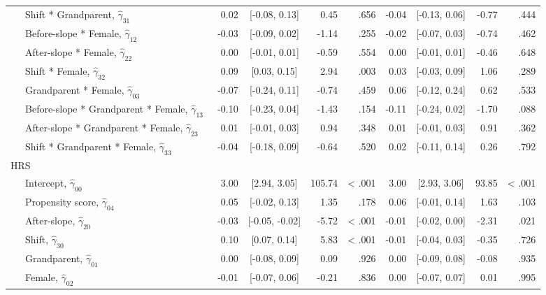 \documentclass[
  english,
  man, noextraspace]{apa7}
\newenvironment{lltable}{\begin{landscape}\begin{center}\begin{ThreePartTable}}{\end{ThreePartTable}\end{center}\end{landscape}}
\begin{document}
\begin{appendix}
\begin{lltable}
{\begin{longtable}{lrcrrrcrr}
\ \ \ Shift * Grandparent, $\hat{\gamma}_{31}$ \textcolor{white}{L} & 0.02 & [-0.08, 0.13] & 0.45 & .656 & -0.04 & [-0.13, 0.06] & -0.77 & .444\\
\ \ \ Before-slope * Female, $\hat{\gamma}_{12}$ & -0.03 & [-0.09, 0.02] & -1.14 & .255 & -0.02 & [-0.07, 0.03] & -0.74 & .462\\
\ \ \ After-slope * Female, $\hat{\gamma}_{22}$ \textcolor{white}{L} & 0.00 & [-0.01, 0.01] & -0.59 & .554 & 0.00 & [-0.01, 0.01] & -0.46 & .648\\
\ \ \ Shift * Female, $\hat{\gamma}_{32}$ \textcolor{white}{L} & 0.09 & [0.03, 0.15] & 2.94 & .003 & 0.03 & [-0.03, 0.09] & 1.06 & .289\\
\ \ \ Grandparent * Female, $\hat{\gamma}_{03}$ \textcolor{white}{L} & -0.07 & [-0.24, 0.11] & -0.74 & .459 & 0.06 & [-0.12, 0.24] & 0.62 & .533\\
\ \ \ Before-slope * Grandparent * Female, $\hat{\gamma}_{13}$ & -0.10 & [-0.23, 0.04] & -1.43 & .154 & -0.11 & [-0.24, 0.02] & -1.70 & .088\\
\ \ \ After-slope * Grandparent * Female, $\hat{\gamma}_{23}$ \textcolor{white}{L} & 0.01 & [-0.01, 0.03] & 0.94 & .348 & 0.01 & [-0.01, 0.03] & 0.91 & .362\\
\ \ \ Shift * Grandparent * Female, $\hat{\gamma}_{33}$ \textcolor{white}{L} & -0.04 & [-0.18, 0.09] & -0.64 & .520 & 0.02 & [-0.11, 0.14] & 0.26 & .792\\
HRS &  &  &  &  &  &  &  & \\
\ \ \ Intercept, $\hat{\gamma}_{00}$ \textcolor{white}{H} & 3.00 & [2.94, 3.05] & 105.74 & < .001 & 3.00 & [2.93, 3.06] & 93.85 & < .001\\
\ \ \ Propensity score, $\hat{\gamma}_{04}$ \textcolor{white}{H} & 0.05 & [-0.02, 0.13] & 1.35 & .178 & 0.06 & [-0.01, 0.14] & 1.63 & .103\\
\ \ \ After-slope, $\hat{\gamma}_{20}$ \textcolor{white}{H} & -0.03 & [-0.05, -0.02] & -5.72 & < .001 & -0.01 & [-0.02, 0.00] & -2.31 & .021\\
\ \ \ Shift, $\hat{\gamma}_{30}$ \textcolor{white}{H} & 0.10 & [0.07, 0.14] & 5.83 & < .001 & -0.01 & [-0.04, 0.03] & -0.35 & .726\\
\ \ \ Grandparent, $\hat{\gamma}_{01}$ \textcolor{white}{H} & 0.00 & [-0.08, 0.09] & 0.09 & .926 & 0.00 & [-0.09, 0.08] & -0.08 & .935\\
\ \ \ Female, $\hat{\gamma}_{02}$ \textcolor{white}{H} & -0.01 & [-0.07, 0.06] & -0.21 & .836 & 0.00 & [-0.07, 0.07] & 0.01 & .995\\

\end{longtable}}
\end{lltable}
\end{appendix}
\end{document}
